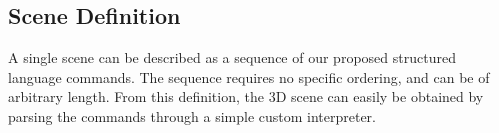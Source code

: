 \subsection{Scene Definition}

A single scene can be described as a sequence of our proposed structured language commands. The sequence requires no specific ordering, and can be of arbitrary length.
From this definition, the 3D scene can easily be obtained by parsing the commands through a simple custom interpreter.




